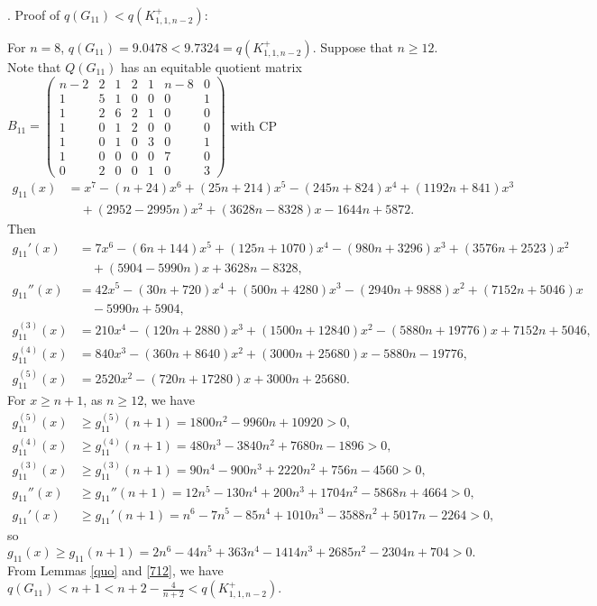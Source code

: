 \documentclass[12pt]{article}
\begin{document}
\begin{appendices}
. Proof of $q(G_{11})<q(K_{1,1,n-2}^+)$:

For $n=8$, $q(G_{11})=9.0478<9.7324=q(K_{1,1,n-2}^+)$.
Suppose that $n\ge 12$. Note that  $Q(G_{11})$ has an equitable quotient matrix
$
B_{11}=
\left(\begin{smallmatrix}
n-2 & 2 & 1& 2& 1 & n-8 & 0\\
1 &5 &1 & 0&0 &0 &1\\
1 &2 &6 & 2&1 &0 &0\\
1 &0 &1 & 2 &0 &0 &0\\
1 &0 &1 &0 &3 &0 &1\\
1 &0 &0 & 0&0 &7 &0\\
0 &2 &0 &0 &1 &0 &3
\end{smallmatrix}\right)$
with CP
\begin{align*}
g_{11}(x)&=x^7 - ( n + 24)x^6 + (25n + 214)x^5 - ( 245n + 824)x^4 + (1192n + 841)x^3\\
& \quad + (2952 - 2995n)x^2 + (3628n - 8328)x - 1644n + 5872.
\end{align*}
Then
\begin{align*}
g_{11}'(x)&=7x^6 - ( 6n + 144)x^5 + (125n + 1070)x^4 - ( 980n + 3296)x^3 + (3576n + 2523)x^2\\
& \quad + (5904 - 5990n)x + 3628n - 8328,\\
g_{11}''(x)&=42x^5 - ( 30n + 720)x^4 + (500n + 4280)x^3 - ( 2940n + 9888)x^2 + (7152n + 5046)x\\
& \quad - 5990n + 5904,\\
g_{11}^{(3)}(x)&=210x^4 -( 120n + 2880)x^3 + (1500n + 12840)x^2 - ( 5880n +19776)x + 7152n + 5046,\\
g_{11}^{(4)}(x)&=840x^3 - ( 360n + 8640)x^2 + (3000n + 25680)x - 5880n - 19776,\\
g_{11}^{(5)}(x)&=2520x^2 -( 720n + 17280)x + 3000n + 25680.
\end{align*}
For $x\ge n+1$, as  $n\ge 12$, we have
\begin{align*}
g_{11}^{(5)}(x)&\ge g_{11}^{(5)}(n+1)=1800n^2 - 9960n + 10920>0,\\
g_{11}^{(4)}(x)&\ge g_{11}^{(4)}(n+1)=480n^3 - 3840n^2 + 7680n - 1896>0,\\
g_{11}^{(3)}(x)&\ge g_{11}^{(3)}(n+1)=90n^4 - 900n^3 + 2220n^2 + 756n - 4560>0,\\
g_{11}''(x)&\ge g_{11}''(n+1)=12n^5 - 130n^4 + 200n^3 + 1704n^2 - 5868n + 4664>0,\\
g_{11}'(x)&\ge g_{11}'(n+1)=n^6 - 7n^5 - 85n^4 + 1010n^3 - 3588n^2 + 5017n - 2264>0,
\end{align*}
so
\[
g_{11}(x)\ge g_{11}(n+1)=2n^6 - 44n^5 + 363n^4 - 1414n^3 + 2685n^2 - 2304n + 704>0.
\]
From Lemmas \ref{quo} and \ref{712}, we have $q(G_{11})<n+1<n+2-\frac{4}{n+2}<q(K_{1,1,n-2}^+)$.\\



\end{appendices}
\end{document}
